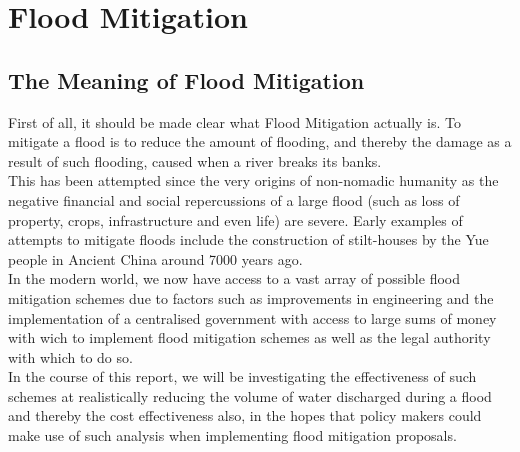 \documentclass[11 pt, a4paper]{article}
\begin{document}
\newpage
\section{Flood Mitigation}
\subsection{The Meaning of Flood Mitigation}
First of all, it should be made clear what Flood Mitigation actually is. To mitigate a flood is to reduce the amount of flooding, and thereby the damage as a result of such flooding, caused when a river breaks its banks.\\ 
This has been attempted since the very origins of non-nomadic humanity as the negative financial and social repercussions of a large flood (such as loss of property, crops, infrastructure and even life) are severe. Early examples of attempts to mitigate floods include the construction of stilt-houses by the Yue people in Ancient China around 7000 years ago.\cite{1}\\ 
In the modern world, we now have access to a vast array of possible flood mitigation schemes due to factors such as improvements in engineering and the implementation of a centralised  government with access to large sums of money with wich to implement flood mitigation schemes as well as the legal authority with which to do so.\\
In the course of this report, we will be investigating the effectiveness of such schemes at realistically reducing the volume of water discharged during a flood and thereby the cost effectiveness also, in the hopes that policy makers could make use of such analysis when implementing flood mitigation proposals.
\end{document}
